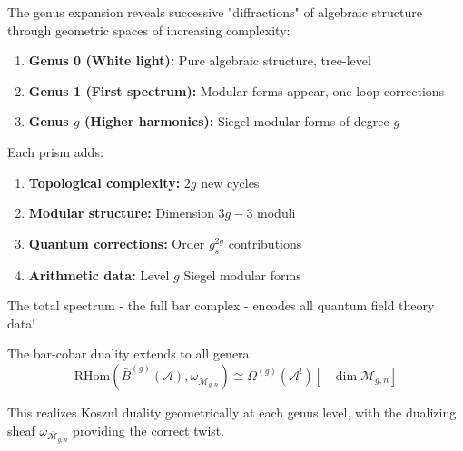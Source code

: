 \begin{principle}\label{principle:extended-prism}
The genus expansion reveals successive "diffractions" of algebraic structure through geometric spaces of increasing complexity:

\begin{enumerate}
\item \textbf{Genus 0 (White light):} Pure algebraic structure, tree-level
\item \textbf{Genus 1 (First spectrum):} Modular forms appear, one-loop corrections
\item \textbf{Genus $g$ (Higher harmonics):} Siegel modular forms of degree $g$
\end{enumerate}

Each prism adds:
\begin{enumerate}
\item \textbf{Topological complexity:} $2g$ new cycles
\item \textbf{Modular structure:} Dimension $3g-3$ moduli
\item \textbf{Quantum corrections:} Order $g_s^{2g}$ contributions
\item \textbf{Arithmetic data:} Level $g$ Siegel modular forms
\end{enumerate}

The total spectrum - the full bar complex - encodes all quantum field theory data!
\end{principle}

\begin{theorem}\label{thm:poincare-extended}
The bar-cobar duality extends to all genera:
$$\text{RHom}(\bar{B}^{(g)}(\mathcal{A}), \omega_{\overline{\mathcal{M}}_{g,n}}) \cong \Omega^{(g)}(\mathcal{A}^!)[-\dim \mathcal{M}_{g,n}]$$

This realizes Koszul duality geometrically at each genus level, with the dualizing sheaf $\omega_{\overline{\mathcal{M}}_{g,n}}$ providing the correct twist.
\end{theorem}

